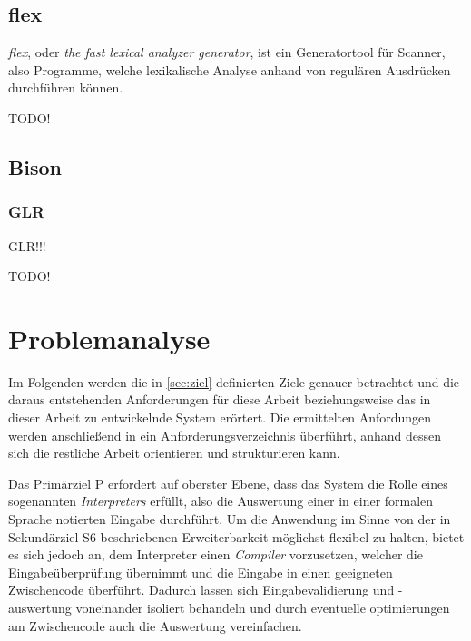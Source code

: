 \documentclass[oneside]{ausarbeitung}
\begin{document}
\section{flex}
	
\textit{flex}, oder \textit{the fast lexical analyzer generator}, ist ein Generatortool für Scanner, also Programme, welche lexikalische Analyse anhand von regulären Ausdrücken durchführen können. 
	
TODO!
	
	
\section{Bison}
	
\subsection{GLR}
	
	
GLR!!!
	
TODO!








\chapter{Problemanalyse}
\label{cha:problemanalyse}

Im Folgenden werden die in \ref{sec:ziel} definierten Ziele genauer betrachtet und die daraus entstehenden Anforderungen für diese Arbeit beziehungsweise das in dieser Arbeit zu entwickelnde System erörtert. Die ermittelten Anfordungen werden anschließend in ein Anforderungsverzeichnis überführt, anhand dessen sich die restliche Arbeit orientieren und strukturieren kann.
	
Das Primärziel P erfordert auf oberster Ebene, dass das System die Rolle eines sogenannten \textit{Interpreters} erfüllt, also die Auswertung einer in einer formalen Sprache notierten Eingabe durchführt. Um die Anwendung im Sinne von der in Sekundärziel S6 beschriebenen Erweiterbarkeit möglichst flexibel zu halten, bietet es sich jedoch an, dem Interpreter einen \textit{Compiler} vorzusetzen, welcher die Eingabeüberprüfung übernimmt und die Eingabe in einen geeigneten Zwischencode überführt. Dadurch lassen sich Eingabevalidierung und -auswertung voneinander isoliert behandeln und durch eventuelle optimierungen am Zwischencode auch die Auswertung vereinfachen.
	
\end{document}
